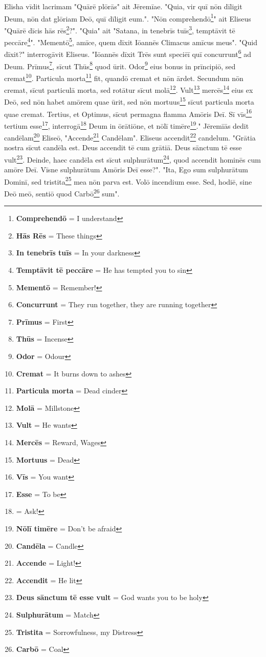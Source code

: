 Elisha vīdit lacrimam "Quārē plōrās" ait Jēremīae. "Quia, vir quī nōn dīligit Deum, nōn dat glōriam Deō, quī dīligit eum.". "Nōn comprehendō\footnote{\textbf{Comprehendō} = I understand}" ait Eliseus "Quārē dīcis hās rēs\footnote{\textbf{Hās Rēs} = These things}?". "Quia" ait "Satana, in tenebrīs tuīs\footnote{\textbf{In tenebrīs tuīs} = In your darkness}, temptāvit tē peccāre\footnote{\textbf{Temptāvit tē peccāre} = He has tempted you to sin}". "Mementō\footnote{\textbf{Mementō} = Remember!}, amīce, quem dīxit Iōannēs Climacus amīcus meus". "Quid dīxit?" interrogāvit Eliseus. "Iōannēs dīxit \: Trēs sunt speciēī quī concurrunt\footnote{\textbf{Concurrunt} = They run together, they are running together} ad Deum. Prīmus\footnote{\textbf{Prīmus} = First}, sīcut Thūs\footnote{\textbf{Thūs} = Incense} quod ūrit. Odor\footnote{\textbf{Odor} = Odour} eius bonus in prīncipiō, sed cremat\footnote{\textbf{Cremat} = It burns down to ashes}. Particula morta\footnote{\textbf{Particula morta} = Dead cinder} fit, quandō cremat et nōn ārdet. Secundum nōn cremat, sīcut particulā morta, sed rotātur sīcut molā\footnote{\textbf{Molā} = Millstone}. Vult\footnote{\textbf{Vult} = He wants} mercēs\footnote{\textbf{Mercēs} = Reward, Wages} eius ex Deō, sed nōn habet amōrem quae ūrit, sed nōn mortuus\footnote{\textbf{Mortuus} = Dead} sīcut particula morta quae cremat. Tertius, et Optimus, sīcut permagna flamma Amōris Deī. Sī vīs\footnote{\textbf{Vīs} = You want} tertium esse\footnote{\textbf{Esse} = To be}, interrogā\footnote{\textbf{} = Ask!} Deum in ōrātiōne, et nōlī timēre\footnote{\textbf{Nōlī timēre} = Don't be afraid}." Jēremīās dedit candēlam\footnote{\textbf{Candēla} = Candle} Eliseō, "Accende\footnote{\textbf{Accende} = Light!} Candēlam". Eliseus accendit\footnote{\textbf{Accendit} = He lit} candelum. "Grātia nostra sīcut candēla est. Deus accendit tē cum grātiā. Deus sānctum tē esse vult\footnote{\textbf{Deus sānctum tē esse vult} = God wants you to be holy}. Deinde, haec candēla est sīcut sulphurātum\footnote{\textbf{Sulphurātum} = Match}, quod accendit hominēs cum amōre Deī. Vīsne sulphurātum Amōris Deī esse?". "Ita, Ego sum sulphurātum Dominī, sed tristita\footnote{\textbf{Tristita} = Sorrowfulness, my Distress} mea nōn parva est. Volō incendium esse. Sed, hodiē, sine Deō meō, sentiō quod Carbō\footnote{\textbf{Carbō} = Coal} sum".\par
